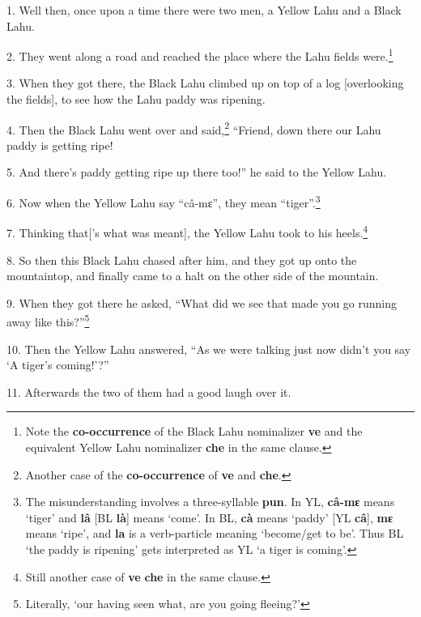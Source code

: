 \setcounter{footnote}{0}

1. Well then, once upon a time there were two men, a Yellow Lahu and a Black Lahu.

2. They went along a road and reached the place where the Lahu fields were.\footnote{Note the \textbf{co-occurrence} of the Black Lahu nominalizer \textbf{ve} and the equivalent Yellow Lahu nominalizer \textbf{che} in the same clause.}

3. When they got there, the Black Lahu climbed up on top of a log [overlooking the
fields], to see how the Lahu paddy was ripening.

4. Then the Black Lahu went over and said,\footnote{Another case of the \textbf{co-occurrence} of \textbf{ve} and \textbf{che}.} ``Friend, down there our Lahu paddy
is getting ripe!

5. And there's paddy getting ripe up there too!'' he said to the Yellow Lahu.

6. Now when the Yellow Lahu say ``câ-mɛ'', they mean ``tiger''.\footnote{The misunderstanding involves a three-syllable \textbf{pun}. In YL, \textbf{câ-mɛ} means `tiger' and \textbf{lâ} [BL \textbf{là}] means `come'. In BL, \textbf{cà} means `paddy' [YL \textbf{câ}], \textbf{mɛ} means `ripe', and \textbf{la} is a verb-particle meaning `become/get to be'. Thus BL `the paddy is ripening' gets interpreted as YL `a tiger is coming'.}

7. Thinking that['s what was meant], the Yellow Lahu took to his heels.\footnote{Still another case of \textbf{ve} \textbf{che} in the same clause.}

8. So then this Black Lahu chased after him, and they got up onto the mountaintop,
and finally came to a halt on the other side of the mountain.

9. When they got there he asked, ``What did we see that made you go running away
like this?''\footnote{Literally, `our having seen what, are you going fleeing?'}

10. Then the Yellow Lahu answered, ``As we were talking just now didn't you say
`A tiger's coming!'?''

11. Afterwards the two of them had a good laugh over it.

